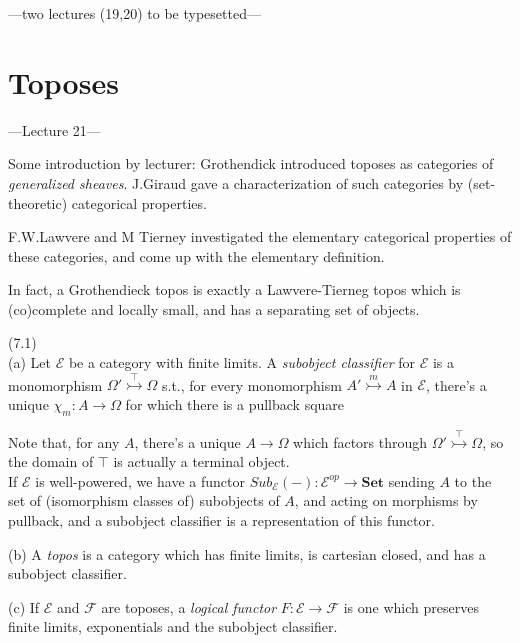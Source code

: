 \documentclass[a4paper]{article}
\begin{document}
---two lectures (19,20) to be typesetted---

\newpage

\section{Toposes}

---Lecture 21---

Some introduction by lecturer: Grothendick introduced toposes as categories of \emph{generalized sheaves}. J.Giraud gave a characterization of such categories by (set-theoretic) categorical properties.

F.W.Lawvere and M Tierney investigated the elementary categorical properties of these categories, and come up with the elementary definition.

In fact, a Grothendieck topos is exactly a Lawvere-Tierneg topos which is (co)complete and locally small, and has a separating set of objects.

\begin{defi} (7.1)\\
    (a) Let $\mathcal{E}$ be a category with finite limits. A \emph{subobject classifier} for $\mathcal{E}$ is a monomorphism $\Omega' \stackrel{\top}{\rightarrowtail} \Omega$ s.t., for every monomorphism $A' \stackrel{m}{\rightarrowtail} A$ in $\mathcal{E}$, there's a unique $\chi_m:A \to \Omega$ for which there is a pullback square


    Note that, for any $A$, there's a unique $A\to \Omega$ which factors through $\Omega' \stackrel{\top}{\rightarrowtail} \Omega$, so the domain of $\top$ is actually a terminal object.\\
    If $\mathcal{E}$ is well-powered, we have a functor $Sub_\mathcal{E} (-):\mathcal{E}^{op} \to \mathbf{Set}$ sending $A$ to the set of (isomorphism classes of) subobjects of $A$, and acting on morphisms by pullback, and a subobject classifier is a representation of this functor.

    (b) A \emph{topos} is a category which has finite limits, is cartesian closed, and has a subobject classifier.

    (c) If $\mathcal{E}$ and $\mathcal{F}$ are toposes, a \emph{logical functor} $F:\mathcal{E} \to \mathcal{F}$ is one which preserves finite limits, exponentials and the subobject classifier.
\end{defi}
\end{document}
